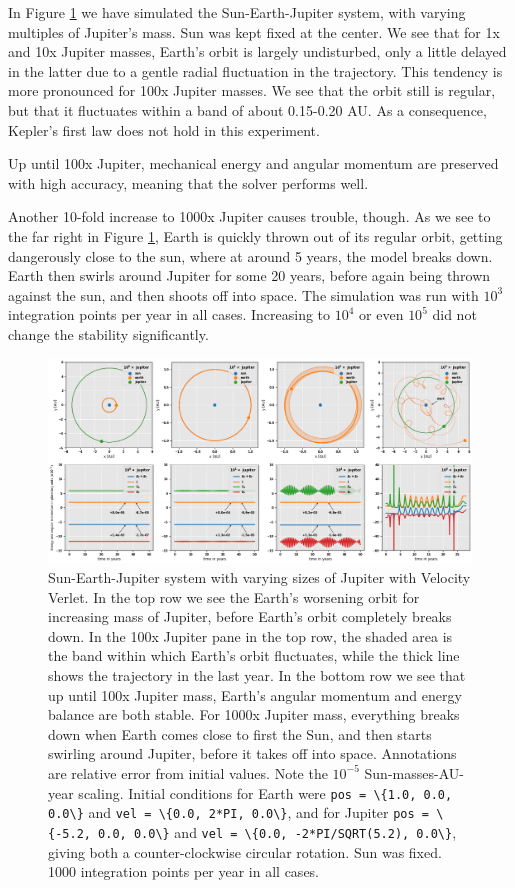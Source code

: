 \documentclass[]{article}
\begin{document}
In Figure \ref{fig:massive-jupiter} we have simulated the Sun-Earth-Jupiter system, with varying multiples of Jupiter's mass. Sun was kept fixed at the center. We see that for 1x and 10x Jupiter masses, Earth's orbit is largely undisturbed, only a little delayed in the latter due to a gentle radial fluctuation in the trajectory. This tendency is more pronounced for 100x Jupiter masses. We see that the orbit still is regular, but that it fluctuates within a band of about 0.15-0.20 AU. As a consequence, Kepler's first law does not hold in this experiment. 

Up until 100x Jupiter, mechanical energy and angular momentum are preserved with high accuracy, meaning that the solver performs well.

Another 10-fold increase to 1000x Jupiter causes trouble, though. As we see to the far right in Figure \ref{fig:massive-jupiter}, Earth is quickly thrown out of its regular orbit, getting dangerously close to the sun, where at around 5 years, the model breaks down. Earth then swirls around Jupiter for some 20 years, before again being thrown against the sun, and then shoots off into space. The simulation was run with $10^3$ integration points per year in all cases. Increasing to $10^4$ or even $10^5$ did not change the stability significantly.

\begin{figure}[!htb]
	\centering
	\includegraphics[width=1\linewidth]{massive-jupiter.png}
	\caption{Sun-Earth-Jupiter system with varying sizes of Jupiter with Velocity Verlet. In the top row we see the Earth's worsening orbit for increasing mass of Jupiter, before Earth's orbit completely breaks down. In the 100x Jupiter pane in the top row, the shaded area is the band within which Earth's orbit fluctuates, while the thick line shows the trajectory in the last year. In the bottom row we see that up until 100x Jupiter mass, Earth's angular momentum and energy balance are both stable. For 1000x Jupiter mass, everything breaks down when Earth comes close to first the Sun, and then starts swirling around Jupiter, before it takes off into space. Annotations are relative error from initial values. Note the $10^{-5}$ Sun-masses-AU-year scaling. Initial conditions for Earth were \lstinline|pos = \{1.0, 0.0, 0.0\}| and \lstinline|vel = \{0.0, 2*PI, 0.0\}|, and for Jupiter \lstinline|pos = \{-5.2, 0.0, 0.0\}| and \lstinline|vel = \{0.0, -2*PI/SQRT(5.2), 0.0\}|, giving both a counter-clockwise circular rotation. Sun was fixed. 1000 integration points per year in all cases.}
	\label{fig:massive-jupiter}
\end{figure}
\end{document}
